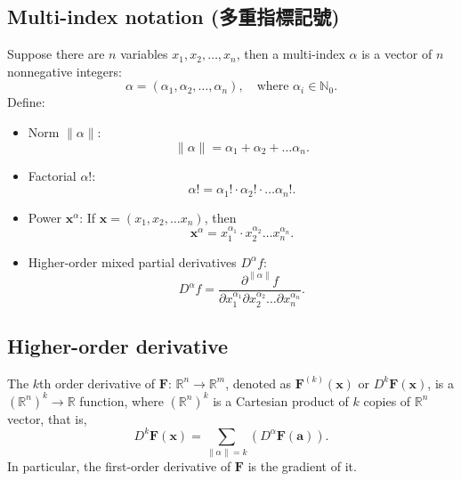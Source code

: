 \documentclass[a4paper,12pt]{report}
\begin{document}
\begin{itemize}
\begin{itemize}
\subsection{Multi-index notation (多重指標記號)}
Suppose there are \( n \) variables \( x_1, x_2, \dots, x_n \), then a multi-index $\alpha$ is a vector of \( n \) nonnegative integers: 
\[
\alpha = (\alpha_1, \alpha_2, \ldots, \alpha_n), \quad \text{where\ } \alpha_i \in \mathbb{N}_0.
\]
Define: 
\begin{itemize}
\item Norm \( \|\alpha\| \): 
\[
\|\alpha\| = \alpha_1 + \alpha_2 + \ldots\alpha_n.
\]
\item Factorial \( \alpha! \): 
\[
\alpha! = \alpha_1! \cdot \alpha_2! \cdot \ldots \alpha_n!.
\]
\item Power \( \mathbf{x}^\alpha \): 
If \( \mathbf{x} = (x_1, x_2, \ldots x_n) \), then
\[
\mathbf{x}^\alpha = x_1^{\alpha_1} \cdot x_2^{\alpha_2} \ldots  x_n^{\alpha_n}.
\]
\item Higher-order mixed partial derivatives $D^\alpha f$: 
\[
D^\alpha f = \frac{\partial^{\|\alpha\|} f}{\partial x_1^{\alpha_1} \partial x_2^{\alpha_2} \ldots  \partial x_n^{\alpha_n}}.
\]
\end{itemize}
\subsection{Higher-order derivative}
The $k$th order derivative of $\mathbf{F}:\,\mathbb{R}^n\to\mathbb{R}^m$, denoted as $\mathbf{F}^{(k)}(\mathbf{x})$ or $D^{k}\mathbf{F}(\mathbf{x})$, is a $(\mathbb{R}^n)^k\to\mathbb{R}$ function, where $(\mathbb{R}^n)^k$ is a Cartesian product of $k$ copies of $\mathbb{R}^n$ vector, that is,
\[D^{k}\mathbf{F}(\mathbf{x})=\sum_{\|\alpha\|=k} \left(D^\alpha \mathbf{F}(\mathbf{a})\right).\]
In particular, the first-order derivative of $\mathbf{F}$ is the gradient of it.

\end{itemize}
\end{itemize}
\end{document}
